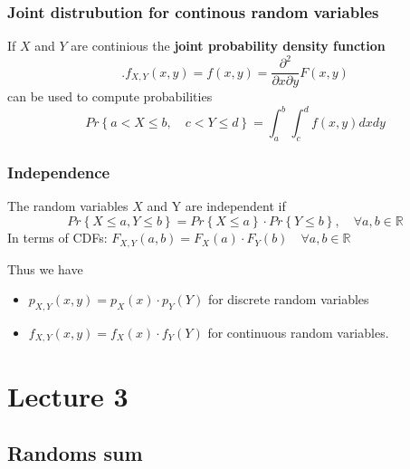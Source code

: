 \documentclass{article}
\theoremstyle{remark}
\begin{document}
\subsubsection{Joint distrubution for continous random variables}%
\label{ssub:joint_distrobution_for_continous_random_variables}

If $X$ and $Y$ are continious the \textbf{joint probability density function}  \[
.f_{X,Y} \left( x,y \right) = f\left( x,y \right) = \frac{\partial ^2}{\partial x \partial y } F\left( x,y \right)   
\]  can be used to compute probabilities \[
Pr\left\{ a < X \le b,  \quad  c < Y \le d  \right\} = \int_{a}^{b} \int_{c}^{d} f\left( x,y \right)dxdy    
\] 

\subsubsection{Independence}%
\label{ssub:independence_3}

The random variables $X$ and Y are independent if \[
Pr\left\{ X \le a , Y \le b \right\} =  Pr\left\{ X \le a \right\} \cdot  Pr\left\{ Y \le b \right\}, \quad  \forall a,b \in  \mathbb{R}  
\] 
In terms of CDFs:  $F_{X,Y}(a,b ) =  F_{X}\left( a \right)\cdot F_{Y}\left( b \right) \quad  \forall a,b \in \mathbb{R}  $
\par
Thus we have 
\begin{itemize}
  \item $p_{X,Y} \left( x,y \right) = p_{X}\left( x \right) \cdot  p_{Y}\left( Y \right)$ for discrete random variables
  \item $f_{X,Y}\left( x,y \right) = f_{X}\left( x \right) \cdot  f_{Y}\left( Y \right)$ for continuous random variables.
\end{itemize}






 
 




\newpage
\section{Lecture 3}%
\label{sec:lecture_3}

\subsection{Randoms sum}%
\label{sub:randoms_sum}
\end{document}
